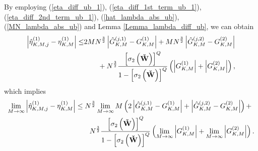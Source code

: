 \documentclass[11pt, draftclsnofoot, onecolumn]{IEEEtran}
\newcommand{\cW}{{\check{W}}}
\begin{document}
\begin{IEEEproof}
By employing (\ref{eta_diff_ub_1}), (\ref{eta_diff_1st_term_ub_1}), (\ref{eta_diff_2nd_term_ub_1}), (\ref{hat_lambda_abs_ub}), (\ref{MN_lambda_abs_ub}) and Lemma \ref{Lemma_lambda_diff_ub}, we can obtain
\begin{align} \notag
\left| {\hat \eta _{K,M,j}^{(1)} - \eta _{K,M}^{(1)}} \right| \le &  2M{N^{\frac{3}{2}}}\left| {\hat G_{K,M}^{(j,1)} - G_{K,M}^{(1)}} \right| + M{N^{\frac{3}{2}}}\left| {\hat G_{K,M}^{(j,2)} - G_{K,M}^{(2)}} \right| \\ \label{eta_diff_ub_2}
& \qquad  + {N^{\frac{3}{2}}}\frac{{{{\left[ {{\sigma _2}\left( {\bf{\cW}} \right)} \right]}^Q}}}{{1 - {{\left[ {{\sigma _2}\left( {\bf{\cW}} \right)} \right]}^Q}}}\left( {\left| {G_{K,M}^{(1)}} \right| + \left| {G_{K,M}^{(2)}} \right|} \right),
\end{align}
which implies
\begin{align} \notag
\mathop {\lim }\limits_{M \to \infty } \left| {\hat \eta _{K,M,j}^{(1)} - \eta _{K,M}^{(1)}} \right| &  \le {N^{\frac{3}{2}}}\mathop {\lim }\limits_{M \to \infty } M\left( {2\left| {\hat G_{K,M}^{(j,1)} - G_{K,M}^{(1)}} \right| + \left| {\hat G_{K,M}^{(j,2)} - G_{K,M}^{(2)}} \right|} \right) + \\ \label{limit_eta_diff_ub_1}
& \qquad  {N^{\frac{3}{2}}}\frac{{{{\left[ {{\sigma _2}\left( {\bf{\cW}} \right)} \right]}^Q}}}{{1 - {{\left[ {{\sigma _2}\left( {\bf{\cW}} \right)} \right]}^Q}}}\left( {\mathop {\lim }\limits_{M \to \infty } \left| {G_{K,M}^{(1)}} \right| + \mathop {\lim }\limits_{M \to \infty } \left| {G_{K,M}^{(2)}} \right|} \right).
\end{align}


\end{IEEEproof}
\end{document}
